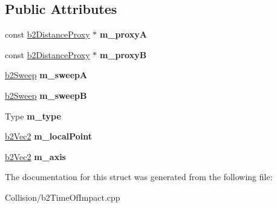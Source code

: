 \subsection*{Public Attributes}
\begin{DoxyCompactItemize}
\item 
\mbox{\label{structb2SeparationFunction_a5c03d798e97cd653aa7db390275bf9a7}} 
const \mbox{\hyperlink{structb2DistanceProxy}{b2\+Distance\+Proxy}} $\ast$ {\bfseries m\+\_\+proxyA}
\item 
\mbox{\label{structb2SeparationFunction_a25fc938e03bf77ac276b17b24e52958f}} 
const \mbox{\hyperlink{structb2DistanceProxy}{b2\+Distance\+Proxy}} $\ast$ {\bfseries m\+\_\+proxyB}
\item 
\mbox{\label{structb2SeparationFunction_a46b838a661baa40cde771b779c2ff341}} 
\mbox{\hyperlink{structb2Sweep}{b2\+Sweep}} {\bfseries m\+\_\+sweepA}
\item 
\mbox{\label{structb2SeparationFunction_a11ba433f6e524fb92390bd8b4dd376b6}} 
\mbox{\hyperlink{structb2Sweep}{b2\+Sweep}} {\bfseries m\+\_\+sweepB}
\item 
\mbox{\label{structb2SeparationFunction_a51075eff2de404a1d82eee831fdfd4af}} 
Type {\bfseries m\+\_\+type}
\item 
\mbox{\label{structb2SeparationFunction_ab77a17de0f5c708212090f599ec1795e}} 
\mbox{\hyperlink{structb2Vec2}{b2\+Vec2}} {\bfseries m\+\_\+local\+Point}
\item 
\mbox{\label{structb2SeparationFunction_a767b8fc4174d200ae8fb1d2bfba3407b}} 
\mbox{\hyperlink{structb2Vec2}{b2\+Vec2}} {\bfseries m\+\_\+axis}
\end{DoxyCompactItemize}


The documentation for this struct was generated from the following file\+:\begin{DoxyCompactItemize}
\item 
Collision/b2\+Time\+Of\+Impact.\+cpp\end{DoxyCompactItemize}
